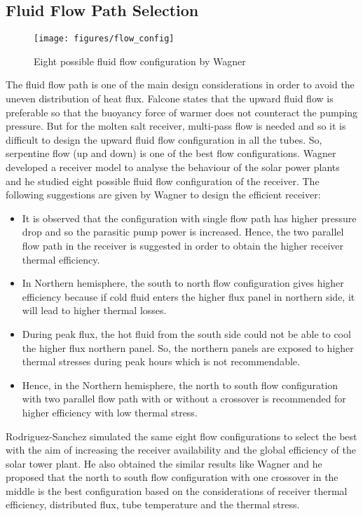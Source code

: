 \subsection{Fluid Flow Path Selection}
\begin{figure}[h]
	\texttt{[image: figures/flow\_config]}
	\centering
	\caption{Eight possible fluid flow configuration by Wagner \cite{Wagner.2008}}	
\end{figure}
\noindent The fluid flow path is one of the main design considerations in order to avoid the uneven distribution of heat flux. Falcone \cite{Falcone.1986} states that the upward fluid flow is preferable so that the buoyancy force of warmer does not counteract the pumping pressure. But for the molten salt receiver, multi-pass flow is needed and so it is difficult to design the upward fluid flow configuration in all the tubes. So, serpentine flow (up and down) is one of the best flow configurations. Wagner \cite{Wagner.2008} developed a receiver model to analyse the behaviour of the solar power plants and he studied eight possible fluid flow configuration of the receiver. The following suggestions are given by Wagner \cite{Wagner.2008} to design the efficient receiver:
\begin{itemize}
	\item It is observed that the configuration with single flow path has higher pressure drop and so the parasitic pump power is increased. Hence, the two parallel flow path in the receiver is suggested in order to obtain the higher receiver thermal efficiency. 
	\item In Northern hemisphere, the south to north flow configuration gives higher efficiency because if cold fluid enters the higher flux panel in northern side, it will lead to higher thermal losses. 
	\item During peak flux, the hot fluid from the south side could not be able to cool the higher flux northern panel. So, the northern panels are exposed to higher thermal stresses during peak hours which is not recommendable.
	\item Hence, in the Northern hemisphere, the north to south flow configuration with two parallel flow path with or without a crossover is recommended for higher efficiency with low thermal stress.
\end{itemize}
Rodriguez-Sanchez \cite{Rodriguez.2015} simulated the same eight flow configurations to select the best with the aim of increasing the receiver availability and the global efficiency of the solar tower plant. He also obtained the similar results like Wagner and he proposed that the north to south flow configuration with one crossover in the middle is the best configuration based on the considerations of receiver thermal efficiency, distributed flux, tube temperature and the thermal stress.
